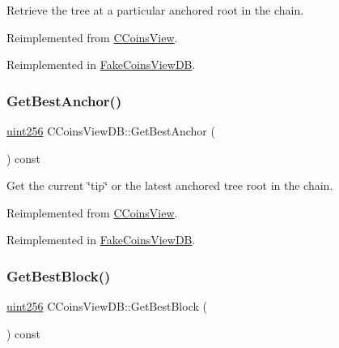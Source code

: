 Retrieve the tree at a particular anchored root in the chain. 



Reimplemented from \mbox{\hyperlink{class_c_coins_view_a2fcf3f99111eef1c41243f54f94d3be8}{C\+Coins\+View}}.



Reimplemented in \mbox{\hyperlink{class_fake_coins_view_d_b_ae52d0073bef3eb64bd64b325e821c52b}{Fake\+Coins\+View\+DB}}.

\mbox{\label{class_c_coins_view_d_b_a2bb7d73a96472def92e332a4563a689c}} 
\subsubsection{\texorpdfstring{Get\+Best\+Anchor()}{GetBestAnchor()}}
{\footnotesize\ttfamily \mbox{\hyperlink{classuint256}{uint256}} C\+Coins\+View\+D\+B\+::\+Get\+Best\+Anchor (\begin{DoxyParamCaption}{ }\end{DoxyParamCaption}) const\hspace{0.3cm}{\ttfamily [virtual]}}



Get the current \char`\"{}tip\char`\"{} or the latest anchored tree root in the chain. 



Reimplemented from \mbox{\hyperlink{class_c_coins_view_a4d51ab1de57e76a174b5ca874c601b52}{C\+Coins\+View}}.



Reimplemented in \mbox{\hyperlink{class_fake_coins_view_d_b_af7870faf849e59188344273a03c9a1b0}{Fake\+Coins\+View\+DB}}.

\mbox{\label{class_c_coins_view_d_b_ac9c513a34b9e58d942fdbeafd9e5bbce}} 
\subsubsection{\texorpdfstring{Get\+Best\+Block()}{GetBestBlock()}}
{\footnotesize\ttfamily \mbox{\hyperlink{classuint256}{uint256}} C\+Coins\+View\+D\+B\+::\+Get\+Best\+Block (\begin{DoxyParamCaption}{ }\end{DoxyParamCaption}) const\hspace{0.3cm}{\ttfamily [virtual]}}



